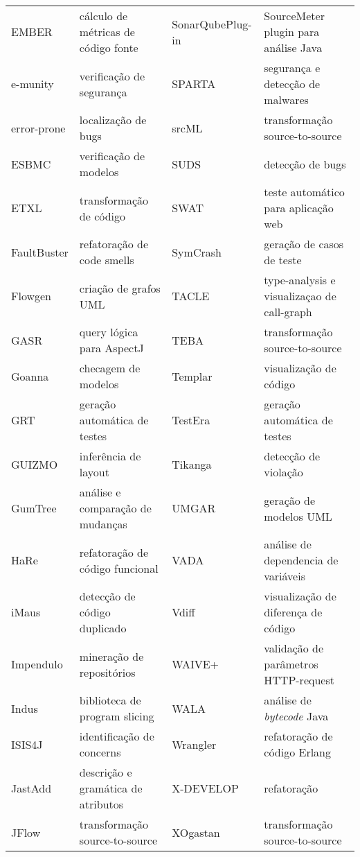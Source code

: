\begin{table}[h]
{\begin{tabular}{| l | l | l | l |}
  EMBER          & cálculo de métricas de código fonte  & SonarQubePlug-in & SourceMeter plugin para análise Java \\
  e-munity       & verificação de segurança             & SPARTA           & segurança e detecção de malwares     \\
  error-prone    & localização de bugs                  & srcML            & transformação source-to-source       \\
  ESBMC          & verificação de modelos               & SUDS             & detecção de bugs                     \\
  ETXL           & transformação de código              & SWAT             & teste automático para aplicação web  \\
  FaultBuster    & refatoração de code smells           & SymCrash         & geração de casos de teste            \\
  Flowgen        & criação de grafos UML                & TACLE            & type-analysis e visualizaçao de call-graph \\
  GASR           & query lógica para AspectJ            & TEBA             & transformação source-to-source       \\
  Goanna         & checagem de modelos                  & Templar          & visualização de código               \\
  GRT            & geração automática de testes         & TestEra          & geração automática de testes         \\
  GUIZMO         & inferência de layout                 & Tikanga          & detecção de violação                 \\
  GumTree        & análise e comparação de mudanças     & UMGAR            & geração de modelos UML               \\
  HaRe           & refatoração de código funcional      & VADA             & análise de dependencia de variáveis  \\
  iMaus          & detecção de código duplicado         & Vdiff            & visualização de diferença de código  \\
  Impendulo      & mineração de repositórios            & WAIVE+           & validação de parâmetros HTTP-request \\
  Indus          & biblioteca de program slicing        & WALA             & análise de {\it bytecode} Java       \\
  ISIS4J         & identificação de concerns            & Wrangler         & refatoração de código Erlang         \\
  JastAdd        & descrição e gramática de atributos   & X-DEVELOP        & refatoração                          \\
  JFlow          & transformação source-to-source       & XOgastan         & transformação source-to-source       \\
  \hline
\end{tabular}
\label{resumo-softwares}
}
\end{table}

